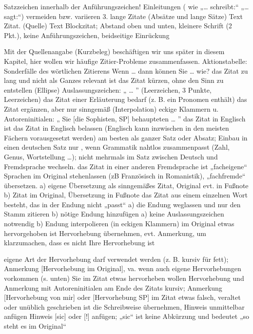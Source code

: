 \documentclass[]{book}
\theoremstyle{definition}
\theoremstyle{definition}
\theoremstyle{definition}
\theoremstyle{remark}
\begin{document}
Satzzeichen innerhalb der Anführungszeichen! Einleitungen ( wie
„\ldots{} schreibt:`` „\ldots{} sagt:``) vermeiden bzw. variieren 3.
lange Zitate (Absätze und lange Sätze) Text Zitat. (Quelle) Text
Blockzitat; Abstand oben und unten, kleinere Schrift (2 Pkt.), keine
Anführungszeichen, beidseitige Einrückung

Mit der Quellenangabe (Kurzbeleg) beschäftigen wir uns später in diesem
Kapitel, hier wollen wir häufige Zitier-Probleme zusammenfassen.
Aktionstabelle: Sonderfälle des wörtlichen Zitierens Wenn \ldots{} dann
können Sie \ldots{} wie? das Zitat zu lang und nicht als Ganzes relevant
ist das Zitat kürzen, ohne den Sinn zu entstellen (Ellipse)
Auslassungszeichen: „ \ldots{} '' (Leerzeichen, 3 Punkte, Leerzeichen)
das Zitat einer Erläuterung bedarf (z. B. ein Pronomen enthält) das
Zitat ergänzen, aber nur sinngemäß (Interpolation) eckige Klammern u.
Autoreninitialen: „ Sie {[}die Sophisten, SP{]} behaupteten \ldots{} ''
das Zitat in Englisch ist das Zitat in Englisch belassen (Englisch kann
inzwischen in den meisten Fächern vorausgesetzt werden) am besten als
ganzer Satz oder Absatz; Einbau in einen deutschen Satz nur , wenn
Grammatik nahtlos zusammenpasst (Zahl, Genus, Wortstellung \ldots{});
nicht mehrmals im Satz zwischen Deutsch und Fremdsprache wechseln. das
Zitat in einer anderen Fremdsprache ist „facheigene`` Sprachen im
Original stehenlassen (zB Französisch in Romanistik), „fachfremde``
übersetzen. a) eigene Übersetzung als sinngemäßes Zitat, Original evt.
in Fußnote b) Zitat im Original, Übersetzung in Fußnote das Zitat aus
einem einzelnen Wort besteht, das in der Endung nicht „passt`` a) die
Endung weglassen und nur den Stamm zitieren b) nötige Endung hinzufügen
a) keine Auslassungszeichen notwendig b) Endung interpolieren (in
eckigen Klammern) im Original etwas hervorgehoben ist Hervorhebung
übernehmen, evt. Anmerkung, um klarzumachen, dass es nicht Ihre
Hervorhebung ist

eigene Art der Hervorhebung darf verwendet werden (z. B. kursiv für
fett); Anmerkung {[}Hervorhebung im Original{]}, va. wenn auch eigene
Hervorhebungen vorkommen (s. unten) Sie im Zitat etwas hervorheben
wollen Hervorhebung und Anmerkung mit Autoreninitialen am Ende des
Zitats kursiv; Anmerkung {[}Hervorhebung von mir{]} oder {[}Hervorhebung
SP{]} im Zitat etwas falsch, veraltet oder unüblich geschrieben ist die
Schreibweise übernehmen, Hinweis unmittelbar anfügen Hinweis {[}sic{]}
oder {[}!{]} anfügen; „sic`` ist keine Abkürzung und bedeutet „so steht
es im Original``
\end{document}
